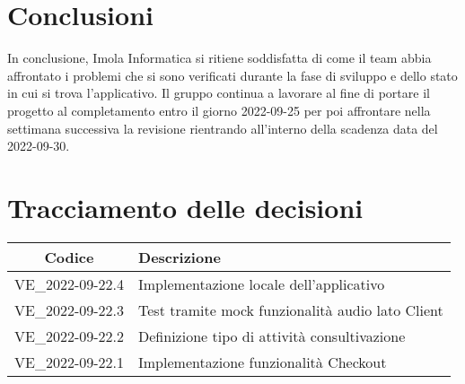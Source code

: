 \section{Conclusioni}
In conclusione, Imola Informatica si ritiene soddisfatta di come il team abbia affrontato i problemi che si sono verificati durante la fase di sviluppo e dello stato in cui si trova l'applicativo. Il gruppo continua a lavorare al fine di portare il progetto al completamento entro il giorno 2022-09-25 per poi affrontare nella settimana successiva la revisione  rientrando all'interno della scadenza data del 2022-09-30. 
\newpage

\section*{Tracciamento delle decisioni}
	\renewcommand{\arraystretch}{1.8} %
	\begin{tabular}{ |c|l| }
		\hline
		\textbf{Codice} & \textbf{Descrizione} \\
		\hline
		VE\_2022-09-22.4 & Implementazione locale dell'applicativo \\
		\hline
		VE\_2022-09-22.3 & Test tramite mock funzionalità audio lato Client\\
		\hline
		VE\_2022-09-22.2 & Definizione tipo di attività consultivazione\\
		\hline
		VE\_2022-09-22.1 & Implementazione funzionalità Checkout\\
		\hline
	\end{tabular}
